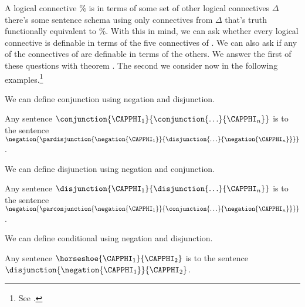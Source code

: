 A logical connective $\%$ is  in terms of some set of other logical connectives $\Delta$ \Iff there's some sentence schema using only connectives from $\Delta$ that's truth functionally equivalent to $\%$. 
With this in mind, we can ask whether every logical connective is definable in terms of the five connectives of \GSL{}.
We can also ask if any of the connectives of \GSL{} are definable in terms of the others.
We answer the first of these questions with theorem .
The second we consider now in the following examples.\footnote{See \citetext{\citealt{Post1921}, \citealt[17]{Hodges2001}}.}

\begin{majorILnc}{}
	We can define conjunction using negation and disjunction.
\end{majorILnc}
\begin{PROOF}
	Any sentence $\conjunction{\CAPPHI_1}{\conjunction{\ldots}{\CAPPHI_{\integer{n}}}}$ is  to the sentence $\negation{\pardisjunction{\negation{\CAPPHI_1}}{\disjunction{\ldots}{\negation{\CAPPHI_{\integer{n}}}}}}$.
\end{PROOF}

\begin{majorILnc}{}
	We can define disjunction using negation and conjunction.
\end{majorILnc}
\begin{PROOF}
	Any sentence $\disjunction{\CAPPHI_1}{\disjunction{\ldots}{\CAPPHI_{\integer{n}}}}$ is  to the sentence $\negation{\parconjunction{\negation{\CAPPHI_1}}{\conjunction{\ldots}{\negation{\CAPPHI_{\integer{n}}}}}}$.
\end{PROOF}

\begin{majorILnc}{}
	We can define conditional using negation and disjunction.
\end{majorILnc}
\begin{PROOF}
	Any sentence $\horseshoe{\CAPPHI_1}{\CAPPHI_2}$ is  to the sentence $\disjunction{\negation{\CAPPHI_1}}{\CAPPHI_2}$.
\end{PROOF}

